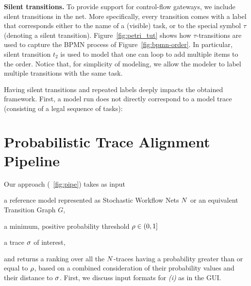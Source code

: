 \noindent
\textbf{Silent transitions.} To provide support for control-flow gateways, we include silent transitions in the net. More specifically, every transition comes with a label that corresponds either to the name of a (visible) task, or to the special symbol $\tau$ (denoting a silent transition). Figure~\ref{fig:petri_tut} shows how $\tau$-transitions are used to capture the BPMN process of Figure~\ref{fig:bpmn-order}. In particular, silent transition $t_2$ is used to model that one can loop to add multiple items to the order. Notice that, for simplicity of modeling, we allow the modeler to label multiple transitions with the same task.

Having silent transitions and repeated labels deeply impacts the obtained framework. First, a model run does not directly correspond to a model trace (consisting of a legal sequence of tasks):


\section{Probabilistic Trace Alignment Pipeline}
Our approach (\figurename~\ref{fig:pipe}) takes as input
\begin{inparaenum}[\it (i)]
	\item a reference model represented as Stochastic Workflow Nets $N$ or an equivalent Transition Graph $G$,
	\item a minimum, positive probability threshold $\rho \in (0,1]$
	\item a trace $\sigma$ of interest,
\end{inparaenum}
and returns a ranking over all the $N$-traces having a probability greater than or equal to $\rho$, based on a combined consideration of their probability values and their distance to $\sigma$. First, we discuss input formats for \textit{(i)} as in the GUI.





